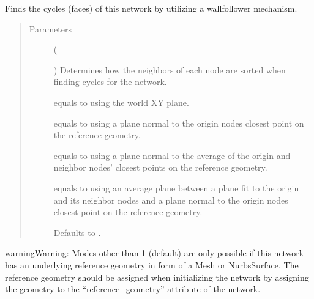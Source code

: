 \documentclass[letterpaper,10pt,english]{sphinxmanual}
\begin{document}
\begin{fulllineitems}
\begin{fulllineitems}
\label{\detokenize{cockatoo:cockatoo.KnitDiNetwork.find_cycles}}
Finds the cycles (faces) of this network by utilizing a wall\sphinxhyphen{}follower
mechanism.
\begin{quote}\begin{description}
\item[{Parameters}] \leavevmode
{} (%
\begin{footnote}[143]\sphinxAtStartFootnote
{}
%
\end{footnote}\sphinxstyleliteralemphasis{\sphinxupquote{, }}) \textendash{} 
Determines how the neighbors of each node are sorted when finding
cycles for the network.

 equals to using the world XY plane.

 equals to using a plane normal to the origin nodes closest
point on the reference geometry.

 equals to using a plane normal to the average of the origin
and neighbor nodes’ closest points on the reference geometry.

 equals to using an average plane between a plane fit to the
origin and its neighbor nodes and a plane normal to the origin
nodes closest point on the reference geometry.

Defaults to .


\end{description}\end{quote}

\begin{sphinxadmonition}{warning}{Warning:}
Modes other than \sphinxhyphen{}1 (default) are only possible if this network has an
underlying reference geometry in form of a Mesh or NurbsSurface. The
reference geometry should be assigned when initializing the network by
assigning the geometry to the “reference\_geometry” attribute of the
network.
\end{sphinxadmonition}

\end{fulllineitems}
\end{fulllineitems}
\end{document}
